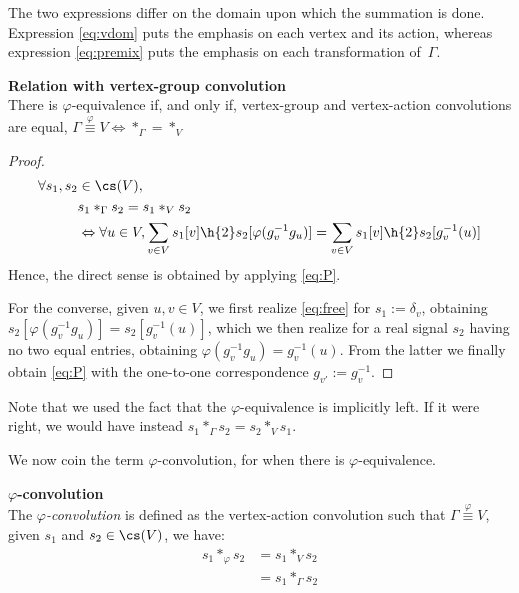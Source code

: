 The two expressions differ on the domain upon which the summation is done. Expression \eqref{eq:vdom} puts the emphasis on each vertex and its action, whereas expression \eqref{eq:premix} puts the emphasis on each transformation of~$\Gamma$.

\begin{lemma}\textbf{Relation with vertex-group convolution}\\
There is $\varphi$-equivalence if, and only if, vertex-group and vertex-action convolutions are equal, \ie
$\Gamma \overset{\varphi}{\equiv} V \Leftrightarrow \ast_{\Gamma} = \ast_{V}$
\label{lem:rel23}
\end{lemma}
\begin{proof}
\begin{align}
\forall s_1, s_2 & \in \cs(V),\nonumber\\
& s_1 \ast_{\Gamma} s_2 = s_1 \ast_{V} s_2 \nonumber\\
& \Leftrightarrow \forall u \in V,
\displaystyle \sum_{v \in V} s_1[v] \h{2} s_2[\varphi(g_v^{-1}g_u)] = \displaystyle \sum_{v \in V} s_1[v] \h{2} s_2[g_v^{-1}(u)] \label{eq:free}
\end{align}
Hence, the direct sense is obtained by applying \eqref{eq:P}.

For the converse, given $u, v \in V$, we first realize \eqref{eq:free} for $s_1 := \delta_v$, obtaining $s_2[\varphi(g_v^{-1}g_u)] = s_2[g_v^{-1}(u)]$, which we then realize for a real signal $s_2$ having no two equal entries, obtaining $\varphi(g_v^{-1}g_u) = g_v^{-1}(u)$. From the latter we finally obtain \eqref{eq:P} with the one-to-one correspondence $g_{v'} := g_v^{-1}$.
\end{proof}

\begin{remark}Note that we used the fact that the $\varphi$-equivalence is implicitly left. If it were right, we would have instead $s_1 \ast_{\Gamma} s_2 = s_2 \ast_{V} s_1$.

\end{remark}

We now coin the term $\varphi$-convolution, for when there is $\varphi$-equivalence.

\begin{definition}\textbf{$\varphi$-convolution}\\
The \emph{$\varphi$-convolution} is defined as the vertex-action convolution such that $\Gamma \overset{\varphi}{\equiv} V$, \ie given $s_1$ and $s_2 \in \cs(V)$, we have:
\begin{align*}
s_1 \ast_{\varphi} s_2 &= s_1 \ast_{V} s_2\\
&= s_1 \ast_{\Gamma} s_2
\end{align*}
\label{def:convv}
\end{definition}

